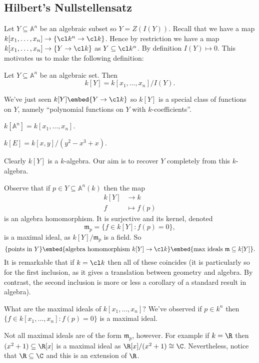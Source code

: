 \documentclass[a4paper]{article}
\renewcommand{\A}{\mathbb{A}}
\begin{document}
\subsection{Hilbert's Nullstellensatz}

Let \(Y \subseteq \A^n\) be an algebraic subset so \(Y = Z(I(Y))\). Recall that we have a map \(k[x_1, \dots, x_n] \to \{\cl k^n \to \cl k\}\). Hence by restriction we have a map \(k[x_1, \dots, x_n] \to \{Y \to \cl k\}\) as \(Y \subseteq \cl k^n\). By definition \(I(Y) \mapsto 0\). This motivates us to make the following definition:

\begin{definition}
  Let \(Y \subseteq \A^n\) be an algebraic set. Then
  \[
    k[Y] = k[x_1, \dots, x_n]/I(Y).
  \]
\end{definition}

We've just seen \(k[Y] \embed \{Y \to \cl k\}\) so \(k[Y]\) is a special class of functions on \(Y\), namely ``polynomial functions on \(Y\) with \(k\)-coefficients''.

\begin{eg}
  \(k[\A^n] = k[x_1, \dots, x_n]\).

  \(k[E] = k[x, y]/(y^2 - x^3 + x)\).
\end{eg}

Clearly \(k[Y]\) is a \(k\)-algebra. Our aim is to recover \(Y\) completely from this \(k\)-algebra.

Observe that if \(p \in Y \subseteq \A^n(k)\) then the map
\begin{align*}
  k[Y] &\to k \\
  f &\mapsto f(p)
\end{align*}
is an algebra homomorphism. It is surjective and its kernel, denoted
\[
  \mathfrak m_p = \{f \in k[Y]: f(p) = 0\},
\]
is a maximal ideal, as \(k[Y]/\mathfrak m_p\) is a field. So
\[
  \{\text{points in } Y\} \embed \{\text{algebra homomorphism } k[Y] \to \cl k\} \embed \{\text{max ideals } \mathfrak m \subseteq k[Y]\}.
\]
It is remarkable that if \(k = \cl k\) then all of these coincides (it is particularly so for the first inclusion, as it gives a translation between geometry and algebra. By contrast, the second inclusion is more or less a corollary of a standard result in algebra).

What are the maximal ideals of \(k[x_1, \dots, x_n]\)? We've observed if \(p \in k^n\) then \(\{f \in k[x_1, \dots, x_n]: f(p) = 0\}\) is a maximal ideal.

Not all maximal ideals are of the form \(\mathfrak m_p\), however. For example if \(k = \R\) then \((x^2 + 1) \subseteq \R[x]\) is a maximal ideal as \(\R[x]/(x^2 + 1) \cong \C\). Nevertheless, notice that \(\R \subseteq \C\) and this is an extension of \(\R\).
\end{document}
